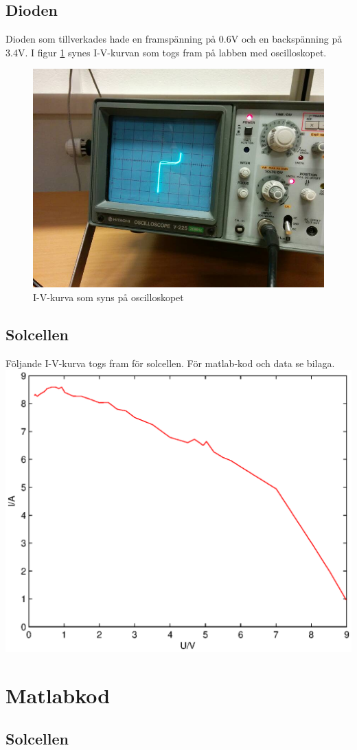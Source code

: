 \documentclass[a4paper]{article}
\begin{document}
\subsection{Dioden}
Dioden som tillverkades hade en framspänning på 0.6V och en backspänning på 3.4V. I figur \ref{diodiv} synes I-V-kurvan som togs fram på labben med oscilloskopet.
\begin{figure}[H]
	\centering
	\includegraphics[scale=.4]{diod.jpg}
	\caption{I-V-kurva som syns på oscilloskopet}
	\label{diodiv}
\end{figure}
\subsection{Solcellen}
Följande I-V-kurva togs fram för solcellen. För matlab-kod och data se bilaga.
\includegraphics[scale=.7]{solcell.eps}
\newpage
\appendix
\section{Matlabkod}
\subsection{Solcellen}

\end{document}
